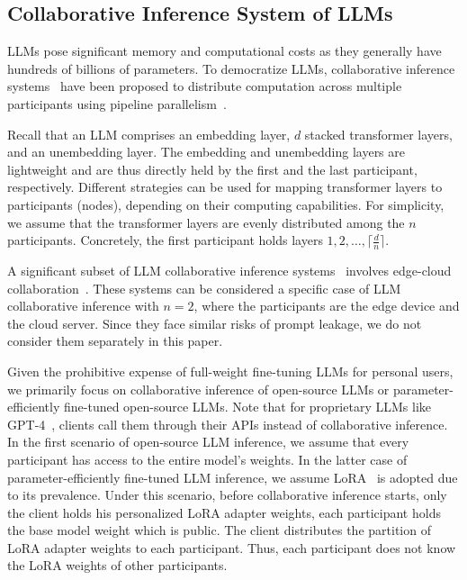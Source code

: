 \subsection{Collaborative Inference System of LLMs}


LLMs pose significant memory and computational costs as they generally have hundreds of billions of parameters. To democratize LLMs, collaborative inference systems~\cite{jiang2023hexgen,PETALS,localai_deml,NESA,skyserve} have been proposed to distribute computation across multiple participants using pipeline parallelism~\cite{pipeline-pl}. 

Recall that an LLM comprises an embedding layer, $d$ stacked transformer layers, and an unembedding layer. The embedding and unembedding layers are lightweight and are thus directly held by the first and the last participant, respectively. Different strategies can be used for mapping transformer layers to participants (nodes), depending on their computing capabilities.  For simplicity, we assume that the transformer layers are evenly distributed among the $n$ participants. Concretely, the first participant holds layers $1, 2, \ldots, \lceil\frac{d}{n}\rceil$. 


A significant subset of LLM collaborative inference systems~\cite{edgecloud2,edgecloud3,edgecloud1} involves edge-cloud collaboration~\cite{xu2023survey}. These systems can be considered a specific case of LLM collaborative inference with $n=2$, where the participants are the edge device and the cloud server. Since they face similar risks of prompt leakage, we do not consider them separately in this paper.

Given the prohibitive expense of full-weight fine-tuning LLMs for personal users, we primarily focus on collaborative inference of open-source LLMs or parameter-efficiently fine-tuned open-source LLMs.  Note that for proprietary LLMs like GPT-4~\cite{gpt4}, clients call them through their APIs instead of collaborative inference. 
In the first scenario of open-source LLM inference, we assume that every participant has access to the entire model's weights. In the latter case of parameter-efficiently fine-tuned LLM inference, we assume LoRA~\cite{lora} is adopted due to its prevalence. Under this scenario, before collaborative inference starts, only the client holds his personalized LoRA adapter weights, each participant holds the base model weight which is public. The client distributes the partition of LoRA adapter weights to each participant. Thus, each participant does not know the LoRA weights of other participants.




